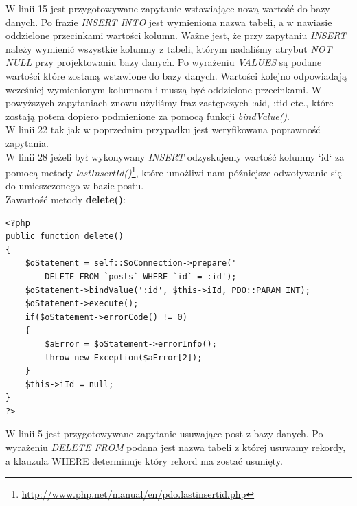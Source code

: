 \documentclass[a4paper,10pt]{article}
\begin{document}
W linii 15 jest przygotowywane zapytanie wstawiające nową wartość do bazy danych. Po frazie \textit{INSERT INTO} jest wymieniona nazwa tabeli, a w nawiasie oddzielone przecinkami wartości kolumn. Ważne jest, że przy zapytaniu \textit{INSERT} należy wymienić wszystkie kolumny z tabeli, którym nadaliśmy atrybut \textit{NOT NULL} przy projektowaniu bazy danych. Po wyrażeniu \textit{VALUES} są podane wartości które zostaną wstawione do bazy danych. Wartości kolejno odpowiadają wcześniej wymienionym kolumnom i muszą być oddzielone przecinkami. W powyższych zapytaniach znowu użyliśmy fraz zastępczych :aid, :tid etc., które zostają potem dopiero podmienione za pomocą funkcji \textit{bindValue()}. \\
W linii 22 tak jak w poprzednim przypadku jest weryfikowana poprawność zapytania. \\
W linii 28 jeżeli był wykonywany \textit{INSERT} odzyskujemy wartość kolumny `id` za pomocą metody \linebreak \textit{lastInsertId()}\footnote{\href{http://www.php.net/manual/en/pdo.lastinsertid.php}{http://www.php.net/manual/en/pdo.lastinsertid.php}}, które umożliwi nam późniejsze odwoływanie się do umieszczonego w bazie postu.\\



Zawartość metody \textbf{delete()}: \\
\begin{verbatim}
<?php
public function delete()
{
	$oStatement = self::$oConnection->prepare('
		DELETE FROM `posts` WHERE `id` = :id');
	$oStatement->bindValue(':id', $this->iId, PDO::PARAM_INT);
	$oStatement->execute();
	if($oStatement->errorCode() != 0)
	{
		$aError = $oStatement->errorInfo();
		throw new Exception($aError[2]);
	}
	$this->iId = null;
}
?>
\end{verbatim}
W linii 5 jest przygotowywane zapytanie usuwające post z bazy danych. Po wyrażeniu \textit{DELETE FROM} podana jest nazwa tabeli z której usuwamy rekordy, a klauzula WHERE determinuje który rekord ma zostać usunięty.
\end{document}
